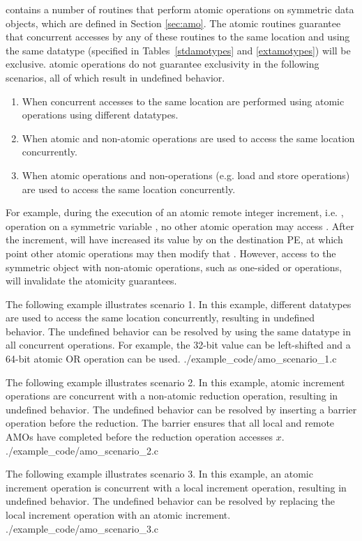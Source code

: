 \openshmem contains a number of routines that perform atomic operations on
symmetric data objects, which are defined in Section \ref{sec:amo}.
The atomic routines
guarantee that concurrent accesses by any of these routines to the same
location and using the same datatype (specified in Tables~\ref{stdamotypes} and
\ref{extamotypes}) will be exclusive.
\openshmem atomic operations do not guarantee exclusivity in the following
scenarios, all of which result in undefined behavior.
\begin{enumerate}
    \item When concurrent accesses to the same location are performed using
        \openshmem atomic operations using different datatypes.
    \item When atomic and non-atomic \openshmem operations are used to access
        the same location concurrently.
    \item When \openshmem atomic operations and non-\openshmem operations (e.g.
        load and store operations) are used to access the same location
        concurrently.
\end{enumerate}
For example, during the execution of an atomic remote integer increment, i.e. ,
operation on a symmetric variable , no other \openshmem atomic operation
may access .  After the increment,  will have increased its value
by  on the destination \ac{PE}, at which point other atomic operations
may then modify that .  However, access to the symmetric object 
with non-atomic operations, such as one-sided  or  operations,
will invalidate the atomicity guarantees.

\cexample
    {The following \CorCpp example illustrates scenario 1.  In this example,
    different datatypes are used to access the same location concurrently,
    resulting in undefined behavior.  The undefined behavior can be resolved by
    using the same datatype in all concurrent operations.  For example, the
    32-bit value can be left-shifted and a 64-bit atomic OR operation can be
    used.}
    {./example_code/amo_scenario_1.c}

\cexample
    {The following \CorCpp example illustrates scenario 2.  In this example,
    atomic increment operations are concurrent with a non-atomic reduction
    operation, resulting in undefined behavior.  The undefined behavior can be
    resolved by inserting a barrier operation before the reduction.  The
    barrier ensures that all local and remote AMOs have completed before the
    reduction operation accesses $x$.}
    {./example_code/amo_scenario_2.c}

\cexample
    {The following \CorCpp example illustrates scenario 3.  In this example, an
    \openshmem atomic increment operation is concurrent with a local increment
    operation, resulting in undefined behavior.  The undefined behavior can be
    resolved by replacing the local increment operation with an \openshmem
    atomic increment.}
    {./example_code/amo_scenario_3.c}
